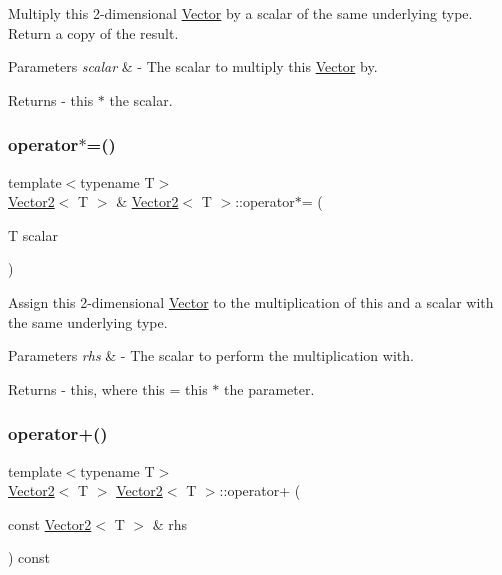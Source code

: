 Multiply this 2-\/dimensional \mbox{\hyperlink{class_vector}{Vector}} by a scalar of the same underlying type. Return a copy of the result. 
\begin{DoxyParams}{Parameters}
{\em scalar} & -\/ The scalar to multiply this \mbox{\hyperlink{class_vector}{Vector}} by. \\
\hline
\end{DoxyParams}
\begin{DoxyReturn}{Returns}
-\/ this $\ast$ the scalar. 
\end{DoxyReturn}
\mbox{\label{class_vector2_ac310f14122b41cbbbb3d4eac98c81f00}} 
\subsubsection{\texorpdfstring{operator$\ast$=()}{operator*=()}}
{\footnotesize\ttfamily template$<$typename T$>$ \\
\mbox{\hyperlink{class_vector2}{Vector2}}$<$ T $>$ \& \mbox{\hyperlink{class_vector2}{Vector2}}$<$ T $>$\+::operator$\ast$= (\begin{DoxyParamCaption}\item[{T}]{scalar }\end{DoxyParamCaption})}

Assign this 2-\/dimensional \mbox{\hyperlink{class_vector}{Vector}} to the multiplication of this and a scalar with the same underlying type. 
\begin{DoxyParams}{Parameters}
{\em rhs} & -\/ The scalar to perform the multiplication with. \\
\hline
\end{DoxyParams}
\begin{DoxyReturn}{Returns}
-\/ this, where \textquotesingle{}this = this $\ast$ the parameter\textquotesingle{}. 
\end{DoxyReturn}
\mbox{\label{class_vector2_af608a3b5bb42148c2260fb0ba9cf0950}} 
\subsubsection{\texorpdfstring{operator+()}{operator+()}}
{\footnotesize\ttfamily template$<$typename T$>$ \\
\mbox{\hyperlink{class_vector2}{Vector2}}$<$ T $>$ \mbox{\hyperlink{class_vector2}{Vector2}}$<$ T $>$\+::operator+ (\begin{DoxyParamCaption}\item[{const \mbox{\hyperlink{class_vector2}{Vector2}}$<$ T $>$ \&}]{rhs }\end{DoxyParamCaption}) const}

